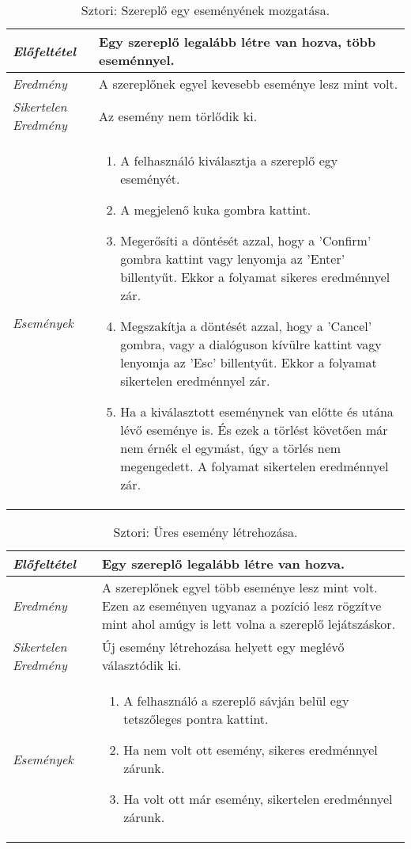 \begin{table}[H]
	\centering
	\begin{tabular}{ | m{} | m{} | }
		\hline
		\emph{Előfeltétel} & Egy szereplő legalább létre van hozva, több eseménnyel.\\
		\hline
		\emph{Eredmény} & A szereplőnek egyel kevesebb eseménye lesz mint volt. \\
		\hline
		\emph{Sikertelen Eredmény} & Az esemény nem törlődik ki. \\
		\hline
		\hline
		\emph{Események} &
		\begin{enumerate}[itemsep=-1ex]
			\item A felhasználó kiválasztja a szereplő egy eseményét.
			\item A megjelenő kuka gombra kattint.
			\item Megerősíti a döntését azzal, hogy a 'Confirm' gombra kattint vagy lenyomja az 'Enter' billentyűt. Ekkor a folyamat sikeres eredménnyel zár.
			\item  Megszakítja a döntését azzal, hogy a 'Cancel' gombra, vagy a dialóguson kívülre kattint vagy lenyomja az 'Esc' billentyűt. Ekkor a folyamat sikertelen eredménnyel zár.
			\item Ha a kiválasztott eseménynek van előtte és utána lévő eseménye is. És ezek a törlést követően már nem érnék el egymást, úgy a törlés nem megengedett. A folyamat sikertelen eredménnyel zár.
		\end{enumerate}
		\\
		\hline
	\end{tabular}
	\caption{Sztori: Szereplő egy eseményének mozgatása.}
	\label{tab:story-timeline-remove-actor-more-event}
\end{table}

\begin{table}[H]
	\centering
	\begin{tabular}{ | m{} | m{} | }
		\hline
		\emph{Előfeltétel} & Egy szereplő legalább létre van hozva.\\
		\hline
		\emph{Eredmény} & A szereplőnek egyel több eseménye lesz mint volt. Ezen az eseményen ugyanaz a pozíció lesz rögzítve mint ahol amúgy is lett volna a szereplő lejátszáskor. \\
		\hline
		\emph{Sikertelen Eredmény} & Új esemény létrehozása helyett egy meglévő választódik ki. \\
		\hline
		\hline
		\emph{Események} &
		\begin{enumerate}[itemsep=-1ex]
			\item A felhasználó a szereplő sávján belül egy tetszőleges pontra kattint.
			\item Ha nem volt ott esemény, sikeres eredménnyel zárunk.
			\item Ha volt ott már esemény, sikertelen eredménnyel zárunk.
		\end{enumerate}
		\\
		\hline
	\end{tabular}
	\caption{Sztori: Üres esemény létrehozása.}
	\label{tab:story-timeline-create-event}
\end{table}

